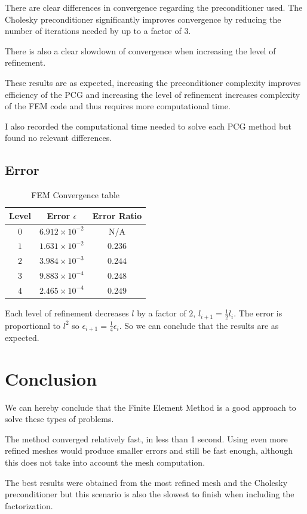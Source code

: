 \documentclass[a4paper, 11pt]{article}
\begin{document}
				There are clear differences in convergence regarding the preconditioner used.
				The Cholesky preconditioner significantly improves convergence by reducing the number of iterations needed by up to a factor of 3.
				
				There is also a clear slowdown of convergence when increasing the level of refinement.
				
				These results are as expected, increasing the preconditioner complexity improves efficiency of the PCG and increasing the level of refinement increases complexity of the FEM code and thus requires more computational time.
						
				I also recorded the computational time needed to solve each PCG method but found no relevant differences.
				
			\subsection{Error}
				\begin{table}[H]
					\centering
					\begin{tabular}{c|c|c}         
						\textbf{Level} 	& \textbf{ Error $ \epsilon $} 		& \textbf{Error Ratio}  \\ \hline
						$ 0  $			& $ 6.912 \times 10^{-2} $ 	& N/A \\ \hline
						$ 1  $			& $ 1.631 \times 10^{-2} $ 	& $ 0.236 $ \\ \hline
						$ 2  $			& $ 3.984 \times 10^{-3} $ 	& $ 0.244 $ \\ \hline
						$ 3  $			& $ 9.883 \times 10^{-4} $	& $ 0.248 $ \\ \hline
						$ 4  $			& $ 2.465 \times 10^{-4} $ 	& $ 0.249 $ \\ 
					\end{tabular}
					\caption{FEM Convergence table}
					\label{table:errors}
				\end{table}
				Each level of refinement decreases $ l $ by a factor of $ 2 $, $ l_{i+1} = \frac{1}{2}l_i $.
				The error is proportional to $l^2$ so $ \epsilon_{i+1} = \frac{1}{4}\epsilon_i $.
				So we can conclude that the results are as expected.
			
			\section{Conclusion}
				We can hereby conclude that the Finite Element Method is a good approach to solve these types of problems.
				
				The method converged relatively fast, in less than 1 second.
				Using even more refined meshes would produce smaller errors and still be fast enough, although this does not take into account the mesh computation.
				
				The best results were obtained from the most refined mesh and the Cholesky preconditioner but this scenario is also the slowest to finish when including the factorization.
	
	
\end{document}
